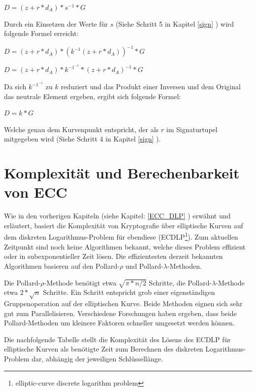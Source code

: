 $D = (z + r*d_A) * s^{-1} * G$

Durch ein Einsetzen der Werte für $s$ (Siehe Schritt 5 in Kapitel \ref{sign} ) wird folgende Formel erreicht:

$D = (z + r*d_A) * (k^{-1}(z+r*d_A))^{-1} * G$

$D = (z + r*d_A) * k^{-1^{-1}} * (z+r*d_A)^{-1} * G$

Da sich $k^{-1^{-1}}$ zu $k$ reduziert und das Produkt einer Inversen und dem Original das neutrale Element ergeben, 
ergibt sich folgende Formel:

$D = k * G$

Welche genau dem Kurvenpunkt entspricht, der als $r$ im Signaturtupel mitgegeben wird (Siehe Schritt 4 in Kapitel \ref{sign} ).

\section{Komplexität und Berechenbarkeit von ECC}

Wie in den vorherigen Kapiteln (siehe Kapitel: \ref{ECC_DLP} ) erwähnt und erläutert, basiert die Komplexität
von Kryptografie über elliptische Kurven auf dem diskreten Logarithmus-Problem für ebendiese 
(ECDLP\footnote{elliptic-curve discrete logarithm problem}).
Zum aktuellen Zeitpunkt sind noch keine Algorithmen bekannt, welche dieses Problem effizient oder in subexponentieller Zeit
lösen.
Die effizientesten derzeit bekannten Algorithmen basieren auf den Pollard-$\rho$ und Pollard-$\lambda$-Methoden\cite{ecc_complexity}.

Die Pollard-$\rho$-Methode benötigt etwa $\sqrt{\pi * n / 2}$ Schritte, die Pollard-$\lambda$-Methode etwa $2*\sqrt{n}$ Schritte.
Ein Schritt entspricht grob einer eigenständigen Gruppenoperation auf der elliptischen Kurve. Beide Methoden eignen sich
sehr gut zum Parallelisieren. Verschiedene Forschungen haben ergeben, dass beide Pollard-Methoden um kleinere Faktoren
schneller umgesetzt werden können\cite{ecc_complexity}.

Die nachfolgende Tabelle stellt die Komplexität des Lösens des ECDLP für elliptische Kurven als benötigte Zeit zum Berechnen
des diskreten Logarithmus-Problem dar, abhängig der jeweiligen Schlüssellänge.


